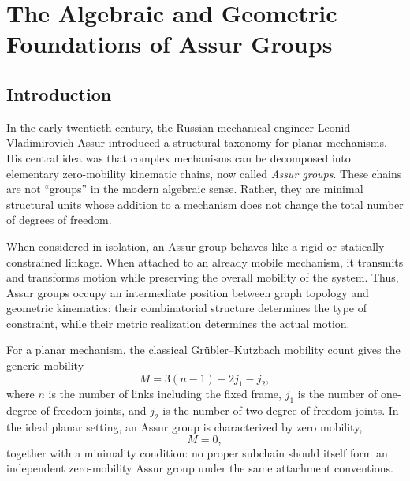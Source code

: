 \chapter{The Algebraic and Geometric Foundations of Assur Groups}

\begin{abstract}
Assur groups, introduced by Leonid Assur in the early twentieth century, provide a structural classification of planar mechanisms through generically zero-mobility kinematic chains. Although the term ``group'' is historical rather than algebraic in the modern sense, Assur groups can be reformulated using contemporary mathematical language. This article presents a concise formal pipeline: first, Assur groups are modeled as discrete kinematic graphs satisfying a mobility constraint; second, their admissible motions are described through configuration spaces and Lie groups. In the planar case the natural motion group is the special Euclidean group $SE(2)$, while $SE(3)$ appears as the corresponding spatial generalization.
\end{abstract}

\section{Introduction}

In the early twentieth century, the Russian mechanical engineer Leonid Vladimirovich Assur introduced a structural taxonomy for planar mechanisms. His central idea was that complex mechanisms can be decomposed into elementary zero-mobility kinematic chains, now called \emph{Assur groups}. These chains are not ``groups'' in the modern algebraic sense. Rather, they are minimal structural units whose addition to a mechanism does not change the total number of degrees of freedom.

When considered in isolation, an Assur group behaves like a rigid or statically constrained linkage. When attached to an already mobile mechanism, it transmits and transforms motion while preserving the overall mobility of the system. Thus, Assur groups occupy an intermediate position between graph topology and geometric kinematics: their combinatorial structure determines the type of constraint, while their metric realization determines the actual motion.

For a planar mechanism, the classical Gr\"ubler--Kutzbach mobility count gives the generic mobility
\begin{equation}
M = 3(n - 1) - 2j_1 - j_2,
\end{equation}
where $n$ is the number of links including the fixed frame, $j_1$ is the number of one-degree-of-freedom joints, and $j_2$ is the number of two-degree-of-freedom joints. In the ideal planar setting, an Assur group is characterized by zero mobility,
\begin{equation}
M = 0,
\end{equation}
together with a minimality condition: no proper subchain should itself form an independent zero-mobility Assur group under the same attachment conventions.

